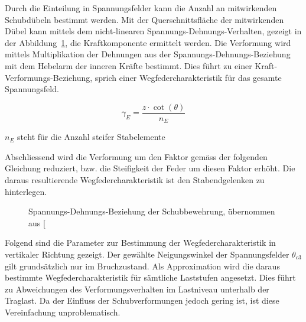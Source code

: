 \documentclass[
  11pt,
  letterpaper,
]{scrreprt}
\begin{document}
Durch die Einteilung in Spannungsfelder kann die Anzahl an mitwirkenden
Schubdübeln bestimmt werden. Mit der Querschnittsfläche der mitwirkenden
Dübel kann mittels dem nicht-linearen Spannungs-Dehnungs-Verhalten,
gezeigt in der Abbildung~\ref{fig-sigma-eps-a3v2}, die Kraftkomponente
ermittelt werden. Die Verformung wird mittels Multiplikation der
Dehnungen aus der Spannungs-Dehnungs-Beziehung mit dem Hebelarm der
inneren Kräfte bestimmt. Dies führt zu einer
Kraft-Verformungs-Beziehung, sprich einer Wegfedercharakteristik für das
gesamte Spannungsfeld.

\[
\gamma_{E} = \frac{z \cdot \cot(\theta)}{n_{E}}
\]

\(n_{E}\) steht für die Anzahl steifer Stabelemente

Abschliessend wird die Verformung um den Faktor gemäss der folgenden
Gleichung reduziert, bzw. die Steifigkeit der Feder um diesen Faktor
erhöht. Die daraus resultierende Wegfedercharakteristik ist den
Stabendgelenken zu hinterlegen.

\begin{figure}[H]


\caption{\label{fig-sigma-eps-a3v2}Spannungs-Dehnungs-Beziehung der
Schubbewehrung, übernommen aus
{[}\citeproc{ref-gitz_ansatze_2024}{1}{]}}

\end{figure}%

Folgend sind die Parameter zur Bestimmung der Wegfedercharakteristik in
vertikaler Richtung gezeigt. Der gewählte Neigungswinkel der
Spannungsfelder \(\theta_{c3}\) gilt grundsätzlich nur im Bruchzustand.
Als Approximation wird die daraus bestimmte Wegfedercharakteristik für
sämtliche Laststufen angesetzt. Dies führt zu Abweichungen des
Verformungsverhalten im Lastniveau unterhalb der Traglast. Da der
Einfluss der Schubverformungen jedoch gering ist, ist diese
Vereinfachung unproblematisch.
\end{document}
